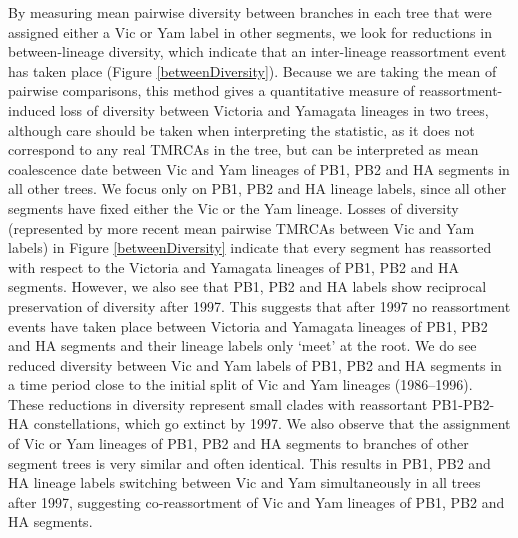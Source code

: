 \documentclass[11pt,oneside,letterpaper]{article}
\begin{document}
By measuring mean pairwise diversity between branches in each tree that were assigned either a Vic or Yam label in other segments, we look for reductions in between-lineage diversity, which indicate that an inter-lineage reassortment event has taken place (Figure \ref{betweenDiversity}).
Because we are taking the mean of pairwise comparisons, this method gives a quantitative measure of reassortment-induced loss of diversity between Victoria and Yamagata lineages in two trees, although care should be taken when interpreting the statistic, as it does not correspond to any real TMRCAs in the tree, but can be interpreted as mean coalescence date between Vic and Yam lineages of PB1, PB2 and HA segments in all other trees.
We focus only on PB1, PB2 and HA lineage labels, since all other segments have fixed either the Vic or the Yam lineage.
Losses of diversity (represented by more recent mean pairwise TMRCAs between Vic and Yam labels) in Figure \ref{betweenDiversity} indicate that every segment has reassorted with respect to the Victoria and Yamagata lineages of PB1, PB2 and HA segments.
However, we also see that PB1, PB2 and HA labels show reciprocal preservation of diversity after 1997.
This suggests that after 1997 no reassortment events have taken place between Victoria and Yamagata lineages of PB1, PB2 and HA segments and their lineage labels only `meet' at the root.
We do see reduced diversity between Vic and Yam labels of PB1, PB2 and HA segments in a time period close to the initial split of Vic and Yam lineages (1986--1996).
These reductions in diversity represent small clades with reassortant PB1-PB2-HA constellations, which go extinct by 1997.
We also observe that the assignment of Vic or Yam lineages of PB1, PB2 and HA segments to branches of other segment trees is very similar and often identical.
This results in PB1, PB2 and HA lineage labels switching between Vic and Yam simultaneously in all trees after 1997, suggesting co-reassortment of Vic and Yam lineages of PB1, PB2 and HA segments. 
\end{document}
